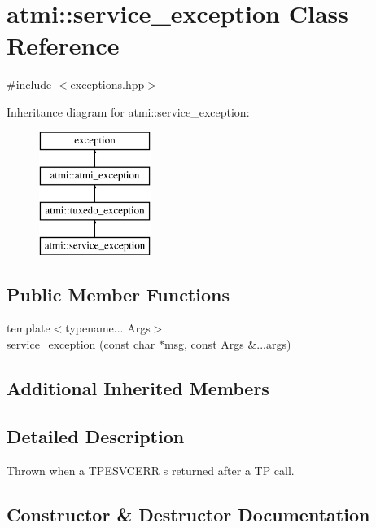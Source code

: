 \hypertarget{classatmi_1_1service__exception}{}\section{atmi\+:\+:service\+\_\+exception Class Reference}
\label{classatmi_1_1service__exception}


{\ttfamily \#include $<$exceptions.\+hpp$>$}

Inheritance diagram for atmi\+:\+:service\+\_\+exception\+:\begin{figure}[H]
\begin{center}
\leavevmode
\includegraphics[height=4.000000cm]{classatmi_1_1service__exception}
\end{center}
\end{figure}
\subsection*{Public Member Functions}
\begin{DoxyCompactItemize}
\item 
{\footnotesize template$<$typename... Args$>$ }\\\hyperlink{classatmi_1_1service__exception_aaaf22082b56169c161573ec3dfd4a6fd}{service\+\_\+exception} (const char $\ast$msg, const Args \&...args)
\end{DoxyCompactItemize}
\subsection*{Additional Inherited Members}


\subsection{Detailed Description}
Thrown when a T\+P\+E\+S\+V\+C\+E\+RR s returned after a TP call. 

\subsection{Constructor \& Destructor Documentation}
